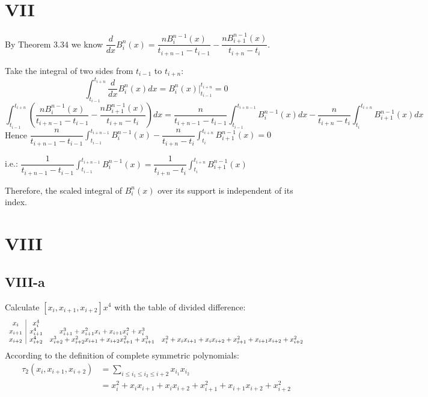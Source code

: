 \documentclass[a4paper]{article}
\begin{document}
\section*{VII}
By Theorem 3.34 we know $\dfrac{d}{dx}B_i^n(x) = \dfrac{nB_i^{n-1}(x)}{t_{i+n-1}-t_{i-1}} - \dfrac{nB_{i+1}^{n-1}(x)}{t_{i+n}-t_i}$.

Take the integral of two sides from $t_{i-1}$ to $t_{i+n}$:
$$
\int_{t_{i-1}}^{t_{i+n}}\frac{d}{dx}B_i^n(x)dx = B_i^n(x) \bigg|_{t_{i-1}}^{t_{i+n}} = 0
$$
$$
\int_{t_{i-1}}^{t_{i+n}}(\dfrac{nB_i^{n-1}(x)}{t_{i+n-1}-t_{i-1}} - \dfrac{nB_{i+1}^{n-1}(x)}{t_{i+n}-t_i})dx
= \dfrac{n}{t_{i+n-1}-t_{i-1}}\int_{t_{i-1}}^{t_{i+n-1}}B_i^{n-1}(x)dx - \dfrac{n}{t_{i+n}-t_{i}}\int_{t_{i}}^{t_{i+n}}B_{i+1}^{n-1}(x)dx
$$
Hence $\displaystyle\dfrac{n}{t_{i+n-1}-t_{i-1}}\int_{t_{i-1}}^{t_{i+n-1}}B_i^{n-1}(x) - \dfrac{n}{t_{i+n}-t_{i}}\int_{t_{i}}^{t_{i+n}}B_{i+1}^{n-1}(x) = 0$ 

i.e.:
$\dfrac{1}{t_{i+n-1}-t_{i-1}}\displaystyle\int_{t_{i-1}}^{t_{i+n-1}}B_i^{n-1}(x) = \dfrac{1}{t_{i+n}-t_{i}}\int_{t_{i}}^{t_{i+n}}B_{i+1}^{n-1}(x)$

Therefore, the scaled integral of $B_i^n(x)$ over its support is independent of its index.

\section*{VIII}
\subsection*{VIII-a}
Calculate $[x_i,x_{i+1},x_{i+2}]x^4$ with the table of divided difference:
$$
\begin{array}{c|c c c c c c}
  x_i & x_i^4 \\
  x_{i+1} & x_{i+1}^4 & x_{i+1}^3 + x_{i+1}^2x_i + x_{i+1}x_i^2 + x_i^3 \\
  x_{i+2} & x_{i+2}^4 & x_{i+2}^3 + x_{i+2}^2x_{i+1} + x_{i+2}x_{i+1}^2 + x_{i+1}^3 & x_i^2 + x_ix_{i+1} + x_ix_{i+2} + x_{i+1}^2 +x_{i+1}x_{i+2} + x_{i+2}^2 \\
\end{array}
$$
According to the definition of complete symmetric polynomials:
\begin{align*}
\tau_2(x_i,x_{i+1},x_{i+2}) &= \sum\limits_{i\leq i_1 \leq i_2 \leq i+2} x_{i_1}x_{i_2} \\
&= x_i^2 + x_ix_{i+1} + x_ix_{i+2} + x_{i+1}^2 +x_{i+1}x_{i+2} + x_{i+2}^2
\end{align*}
\end{document}
